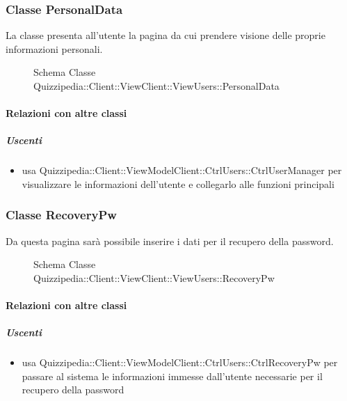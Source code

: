 \subsubsection{Classe PersonalData}
La classe presenta all'utente la pagina da cui prendere visione delle proprie informazioni personali.
\begin{figure}[H]
\centering
\noindent{}
\caption[Schema Classe PersonalData]{Schema Classe Quizzipedia::Client::ViewClient::ViewUsers::PersonalData}
\end{figure}
\paragraph{Relazioni con altre classi}
\subparagraph{Uscenti}
\begin{itemize}
\item usa Quizzipedia::Client::ViewModelClient::CtrlUsers::CtrlUserManager per visualizzare le informazioni dell'utente e collegarlo alle funzioni principali
\end{itemize}
\subsubsection{Classe RecoveryPw}
Da questa pagina sarà possibile inserire i dati per il recupero della password.
\begin{figure}[H]
\centering
\noindent{}
\caption[Schema Classe RecoveryPw]{Schema Classe Quizzipedia::Client::ViewClient::ViewUsers::RecoveryPw}
\end{figure}
\paragraph{Relazioni con altre classi}
\subparagraph{Uscenti}
\begin{itemize}
\item usa Quizzipedia::Client::ViewModelClient::CtrlUsers::CtrlRecoveryPw per passare al sistema le informazioni immesse dall'utente necessarie per il recupero della password
\end{itemize}
